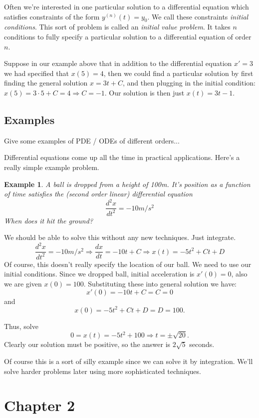 \documentclass[14pt]{article}
\newtheorem{ex}{Example}
\begin{document}
Often we're interested in one particular solution to a differential equation which satisfies
constraints of the form $y^{(n)}(t) = y_0$. We call these constraints \emph{initial
  conditions}. This sort of problem is called an \emph{initial value problem}. It takes $n$
conditions to fully specify a particular solution to a differential equation of order $n$.

Suppose in our example above that in addition to the differential equation $x'=3$ we had specified
that $x(5) = 4$, then we could find a particular solution by first finding the general solution $x =
3t + C$, and then plugging in the initial condition: $x(5) = 3 \cdot 5 + C = 4 \Rightarrow C =
-1$. Our solution is then just $x(t) = 3 t -1 $.


\subsection*{Examples}
Give some examples of PDE / ODEs of different orders...

Differential equations come up all the time in practical applications. Here's a really simple
example problem. 

\begin{ex}
  A ball is dropped from a height of 100m. It's position as a function of time satisfies the (second
  order linear) differential equation
  \[\frac{d^2x}{dt^2} = -10 m/s^2 \]
  When does it hit the ground?
\end{ex}

We should be able to solve this without any new techniques. Just integrate.
  \[\frac{d^2x}{dt^2} = -10 m/s^2 \Rightarrow \frac{dx}{dt} = -10 t + C \Rightarrow x(t) = -5 t^2 +
  C t + D \] Of course, this doesn't really specify the location of our ball. We need to use our
  initial conditions. Since we dropped ball, initial acceleration is $x'(0) = 0$, also we are given
  $x(0) = 100$. Substituting these into general solution we have:
  \[x'(0) = -10 t + C = C = 0\] and
  \[x(0) = -5 t^2 + C t + D = D = 100.\]

Thus, solve
\[0 = x(t) = -5 t^2 + 100 \Rightarrow t = \pm \sqrt{20}.\]
Clearly our solution must be positive, so the answer is $2 \sqrt 5$ seconds.

Of course this is a sort of silly example since we can solve it by integration. We'll solve harder
problems later using more sophisticated techniques.

\section{Chapter 2}
\end{document}
